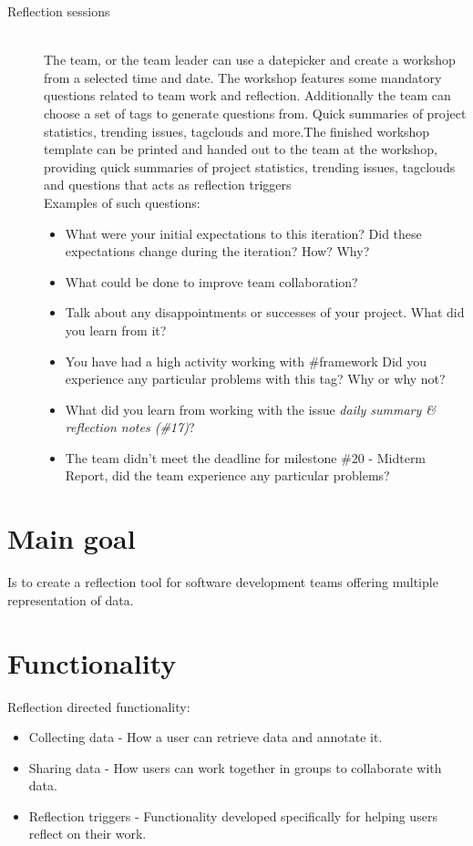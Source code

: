 \begin{description}
	\item[Reflection sessions] \hfill \\
	The team, or the team leader can use a datepicker and create a workshop from a selected time and date. The workshop features some mandatory questions
	related to team work and reflection. Additionally the team can choose a set of tags to generate questions from. Quick summaries of project statistics, trending issues, tagclouds and more.The finished workshop template can be printed and
	handed out to the team at the workshop, providing quick summaries of project statistics, trending issues, tagclouds and questions that acts as reflection triggers\\
	Examples of such questions: 
		\begin{itemize}
			\item What were your initial expectations to this iteration? Did these expectations change during the iteration? How? Why?
			\item What could be done to improve team collaboration?
			\item Talk about any disappointments or successes of your project. What did you learn from it?
			\item You have had a high activity working with \#framework Did you experience any particular problems with this tag? Why or why not?
			\item What did you learn from working with the issue \textit{daily summary \& reflection notes (\#17)}?
			\item The team didn't meet the deadline for milestone \#20 - Midterm Report, did the team experience any particular problems?
		\end{itemize}
\end{description}

\section{Main goal}
Is to create a reflection tool for software development teams offering multiple representation of data. %

\section{Functionality}

Reflection directed functionality:
\begin{itemize}
\item Collecting data - How a user can retrieve data and annotate it. 
\item Sharing data - How users can work together in groups to collaborate with data. 
\item Reflection triggers - Functionality developed specifically for helping users reflect on their work.
\end{itemize}

